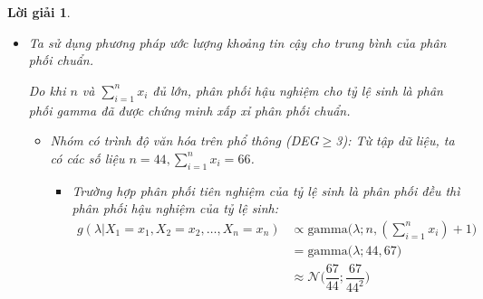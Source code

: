 \documentclass[14pt, a4paper]{article}
\theoremstyle{sltheorem}
\theoremstyle{soltheorem}
\newtheorem*{loigiai}{Lời giải}
\begin{document}
\begin{loigiai}
\begin{enumerate}
\begin{itemize}
\begin{itemize}
\begin{itemize}
                Ta thu được $l\approx 1.7119, r\approx2.2331$.
                Vậy khoảng tin cậy cho tỷ lệ sinh với độ tin cậy 0.95 là $(1.7119;2.2331)$.
                \item Trường hợp phân phối tiên nghiệm của tỷ lệ sinh là phân phối gamma $g(\lambda) = \text{gamma}(\lambda; r, \alpha)=\text{gamma}(\lambda; 2, 10)$ thì phân phối hậu nghiệm của tỷ lệ sinh là:
                \begin{equation*}
                    g(\lambda \vert X_1 =x_1, X_2=x_2, \dots, X_n=x_n) = \text{gamma}\big(\lambda; 113, 227 \big)
                \end{equation*}

                Ta sử dụng code R để tìm $l$ và $r$:

                \begin{python}
l <- qgamma(0.025, 227, 113);
r <- qgamma(0.975, 227, 113);
l
r
                \end{python}

                Ta thu được $l\approx 1.7560, r\approx2.2785$.
                Vậy khoảng tin cậy cho tỷ lệ sinh với độ tin cậy 0.95 là $(1.7560;2.2785)$.
            \end{itemize}
        \end{itemize}


        \item Ta sử dụng phương pháp ước lượng khoảng tin cậy cho trung bình của phân phối chuẩn.
        
        Do khi $n$ và $\sum_{i=1}^n x_i$ đủ lớn, phân phối hậu nghiệm cho tỷ lệ sinh là phân phối gamma đã được chứng minh xấp xỉ phân phối chuẩn.

        \begin{itemize}
            \item Nhóm có trình độ văn hóa trên phổ thông (DEG$\geq$3):
            Từ tập dữ liệu, ta có các số liệu $n=44, \sum_{i=1}^n x_i=66$.

            \begin{itemize}
                \item Trường hợp phân phối tiên nghiệm của tỷ lệ sinh là phân phối đều thì phân phối hậu nghiệm của tỷ lệ sinh:
                \begin{equation*}
                    \begin{aligned}
                        g(\lambda \vert X_1 =x_1, X_2=x_2, \dots, X_n=x_n) &\propto \text{gamma}\big(\lambda; n, (\sum_{i=1}^n x_i) + 1\big) \\
                        &= \text{gamma}\big(\lambda; 44, 67\big) \\
                        &\approx \mathcal{N} \Big(\dfrac{67}{44}; \dfrac{67}{44^2} \Big)
                    \end{aligned}
                \end{equation*}
                

\end{itemize}
\end{itemize}
\end{itemize}
\end{enumerate}
\end{loigiai}
\end{document}
